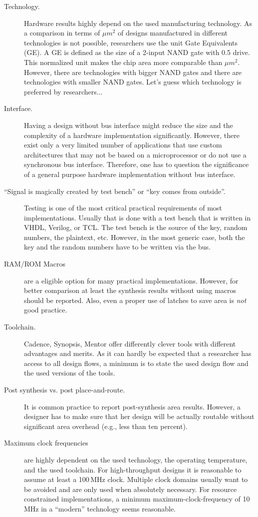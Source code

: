 \documentclass[runningheads]{llncs}
\begin{document}
\begin{description}
\item[Technology.] Hardware results highly depend on the used manufacturing technology. As a comparison in terms of $\mu m^2$ of designs manufactured in different technologies is not possible, researchers use the unit Gate Equivalents (GE). A GE is defined as the size of a 2-input NAND gate with 0.5 drive. This normalized unit makes the chip area more comparable than ${\mu}m^2$. However, there are technologies with bigger NAND gates and there are technologies with smaller NAND gates. Let's guess which technology is preferred by researchers...
\item[Interface.] Having a design without bus interface might reduce the size and the complexity of a hardware implementation significantly. However, there exist only a very limited number of applications that use custom architectures that may not be based on a microprocessor or do not use a synchronous bus interface. Therefore, one has to question the significance of a general purpose hardware implementation without bus interface.
\item[``Signal is magically created by test bench'' or ``key comes from outside''.] Testing is one of the most critical practical requirements of most implementations. Usually that is done with a test bench that is written in VHDL, Verilog, or TCL. The test bench is the source of the key, random numbers, the plaintext, etc. However, in the most generic case, both the key and the random numbers have to be written via the bus.
\item[RAM/ROM Macros] are a eligible option for many practical implementations. However, for better comparison at least the synthesis results without using macros should be reported. Also, even a proper use of latches to save area is \emph{not} good practice.
\item[Toolchain.] Cadence, Synopsis, Mentor offer differently clever tools with different advantages and merits. As it can hardly be expected that a researcher has access to all design flows, a minimum is to state the used design flow and the used versions of the tools.
\item[Post synthesis vs. post place-and-route.] It is common practice to report post-synthesis area results. However, a designer has to make sure that her design will be actually routable without significant area overhead (e.g., less than ten percent).
\item[Maximum clock frequencies] are highly dependent on the used technology, the operating temperature, and the used toolchain. For high-throughput designs it is reasonable to assume at least a 100\,MHz clock. Multiple clock domains usually want to be avoided and are only used when absolutely necessary. For resource constrained implementations, a minimum maximum-clock-frequency of 10\,MHz in a ``modern'' technology seems reasonable.

\end{description}
\end{document}
